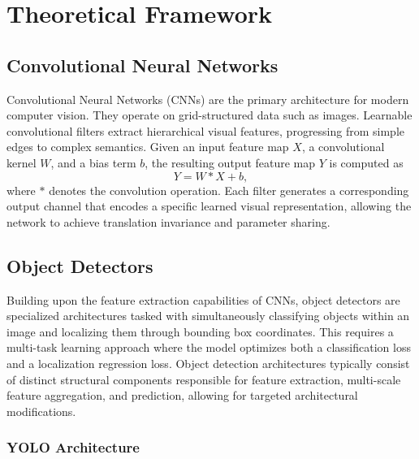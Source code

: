 %
%
%                 

\chapter{Theoretical Framework}
\label{sec:theoframework}

\section{Convolutional Neural Networks}
Convolutional Neural Networks (CNNs) are the primary architecture for modern computer vision. They operate on grid-structured data such as images. Learnable convolutional filters extract hierarchical visual features, progressing from simple edges to complex semantics. Given an input feature map $X$, a convolutional kernel $W$, and a bias term $b$, the resulting output feature map $Y$ is computed as
\begin{equation}
Y = W \ast X + b,
\end{equation}
where $\ast$ denotes the convolution operation. Each filter generates a corresponding output channel that encodes a specific learned visual representation, allowing the network to achieve translation invariance and parameter sharing.

\section{Object Detectors}
Building upon the feature extraction capabilities of CNNs, object detectors are specialized architectures tasked with simultaneously classifying objects within an image and localizing them through bounding box coordinates. This requires a multi-task learning approach where the model optimizes both a classification loss and a localization regression loss. Object detection architectures typically consist of distinct structural components responsible for feature extraction, multi-scale feature aggregation, and prediction, allowing for targeted architectural modifications.

\subsection{YOLO Architecture}

